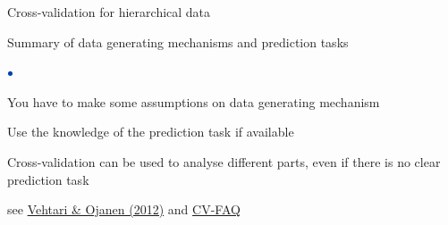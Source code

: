 \documentclass[english,t]{beamer}
\newenvironment{list1}{
   \begin{list}{$\color{list1}\bullet$}{\itemsep=6pt}}{
  \end{list}}
\begin{document}
\begin{frame}{Cross-validation for hierarchical data}
  \\
  
\end{frame}

\begin{frame}{}

{\Large\color{navyblue} Summary of data generating mechanisms and prediction tasks}

\begin{list1}
\item You have to make some assumptions on data generating mechanism
\item Use the knowledge of the prediction task if available
\item Cross-validation can be used to analyse different parts, even if
  there is no clear prediction task
\end{list1}

\vspace{7.5\baselineskip}
{ \small see \href{http://dx.doi.org/10.1214/12-SS102}{Vehtari \& Ojanen (2012)} and \href{https://users.aalto.fi/~ave/modelselection/CV-FAQ.html}{CV-FAQ}}

\end{frame}
\end{document}
